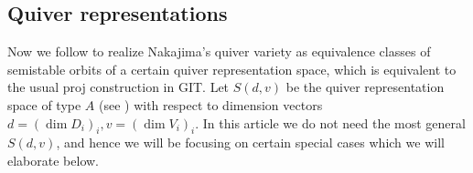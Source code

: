\documentclass[11pt,reqno]{amsart}
\numberwithin{equation}{section}
\theoremstyle{definition}
\def\<{\langle}
\def\>{\rangle}
\newcommand{\cB}{\mathcal{B}}
\newcommand{\inv}{^{-1}}
\newcommand{\cupaa}{\begin{tikzpicture}[baseline={(0,-.3)}, scale = 0.8]
\draw (-.25,0) -- (1.75,0) -- (1.75,-.9) -- (-.25,-.9) -- cycle;
\begin{footnotesize}
\node at (0,.2) {$1$};
\node at (.5,.2) {$2$};
\node at (1,.2) {$3$};
\node at (1.5,.2) {$4$};
\end{footnotesize}
\draw[thick] (0.5,0) .. controls +(0,-.5) and +(0,-.5) .. +(.5,0);
\draw[thick] (0,0) .. controls +(0,-1) and +(0,-1) .. +(1.5,0);
\end{tikzpicture}
}
\newcommand{\cupab}{\begin{tikzpicture}[baseline={(0,-.3)}, scale = 0.8]
\draw (-.25,0) -- (1.75,0) -- (1.75,-.9) -- (-.25,-.9) -- cycle;
\begin{footnotesize}
\node at (0,.2) {$1$};
\node at (.5,.2) {$2$};
\node at (1,.2) {$3$};
\node at (1.5,.2) {$4$};
\end{footnotesize}
\draw[thick] (0,0) .. controls +(0,-.5) and +(0,-.5) .. +(.5,0);
\draw[thick] (1,0) .. controls +(0,-.5) and +(0,-.5) .. +(.5,0);
\end{tikzpicture}
}
\begin{document}


\subsection{Quiver representations}
Now we follow \cite{Maf05} to realize Nakajima's quiver variety 
as equivalence classes of semistable orbits of a certain quiver representation space, 
which is equivalent to the usual proj construction in GIT. 
Let $S(d,v)$ be the quiver representation space of type $A$ (see \cite[Defn.~5]{Maf05}) with respect to dimension vectors $d = (\dim D_i)_i, v = (\dim V_i)_i$.
In this article we do not need the most general $S(d,v)$, and hence we will be focusing on certain special cases which we will elaborate below.
 
\end{document}
